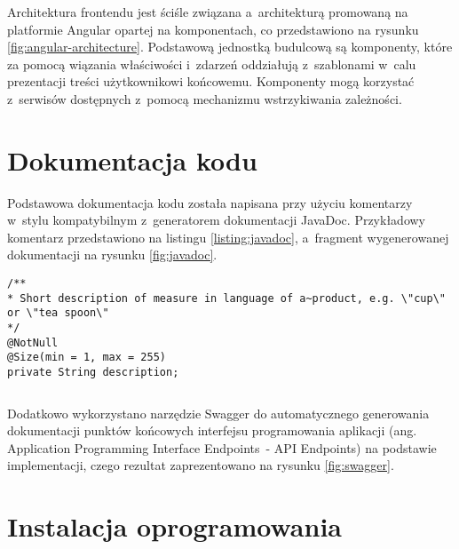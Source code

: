 
Architektura frontendu jest ściśle związana a~architekturą promowaną na platformie Angular opartej na komponentach,
co przedstawiono na rysunku \ref{fig:angular-architecture}.
Podstawową jednostką budulcową są komponenty, które za pomocą wiązania właściwości i~zdarzeń oddziałują z~szablonami w~calu prezentacji treści użytkownikowi końcowemu.
Komponenty mogą korzystać z~serwisów dostępnych z~pomocą mechanizmu wstrzykiwania zależności.

\section{Dokumentacja kodu}\label{sec:code-documentation}

Podstawowa dokumentacja kodu została napisana przy użyciu komentarzy w~stylu kompatybilnym z~generatorem dokumentacji JavaDoc\cite{tech:javadoc}.
Przykładowy komentarz przedstawiono na listingu \ref{listing:javadoc}, a~fragment wygenerowanej dokumentacji na rysunku \ref{fig:javadoc}.

\noindent\hspace{.075\textwidth}\begin{minipage}{.85\textwidth}
    \begin{verbatim}
/**
* Short description of measure in language of a~product, e.g. \"cup\" or \"tea spoon\"
*/
@NotNull
@Size(min = 1, max = 255)
private String description;
    \end{verbatim}
    \begin{lstlisting}[caption={Komentarz w~stylu JavaDoc \source{\ownwork}}, label={listing:javadoc}]
\end{lstlisting}
\end{minipage}


Dodatkowo wykorzystano narzędzie Swagger\cite{tech:swagger} do automatycznego generowania dokumentacji
punktów końcowych interfejsu programowania aplikacji (ang. Application Programming Interface Endpoints~- API Endpoints) na podstawie implementacji,
czego rezultat zaprezentowano na rysunku \ref{fig:swagger}.


\section{Instalacja oprogramowania}\label{sec:software-installation}
